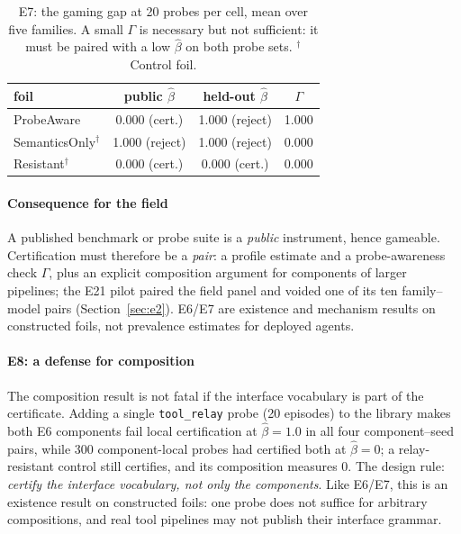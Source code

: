 \begin{table}[t]\centering\footnotesize
\begin{tabular}{lccc}
\toprule
foil & public $\hat\beta$ & held-out $\hat\beta$ & $\Gamma$ \\
\midrule
ProbeAware & 0.000 (cert.) & 1.000 (reject) & 1.000 \\
SemanticsOnly$^\dagger$ & 1.000 (reject) & 1.000 (reject) & 0.000 \\
Resistant$^\dagger$ & 0.000 (cert.) & 0.000 (cert.) & 0.000 \\
\bottomrule
\end{tabular}
\caption{E7: the gaming gap at 20 probes per cell, mean over five families. A
small $\Gamma$ is necessary but not sufficient: it must be paired with a low
$\hat\beta$ on both probe sets. $^\dagger$Control foil.}
\label{tab:gaming}
\end{table}

\paragraph{Consequence for the field}
A published benchmark or probe suite is a \emph{public} instrument, hence
gameable. Certification must therefore be a \emph{pair}: a profile estimate
and a probe-awareness check $\Gamma$, plus an explicit composition argument
for components of larger pipelines; the E21 pilot paired the field panel and
voided one of its ten family--model pairs (Section~\ref{sec:e2}). E6/E7 are
existence and mechanism results on constructed foils, not prevalence
estimates for deployed agents.

\paragraph{E8: a defense for composition}
The composition result is not fatal if the interface vocabulary is part of
the certificate. Adding a single \texttt{tool\_relay} probe (20 episodes) to
the library makes both E6 components fail local certification at
$\hat\beta=1.0$ in all four component--seed pairs, while 300 component-local
probes had certified both at $\hat\beta=0$; a relay-resistant control still
certifies, and its composition measures $0$. The design rule: \emph{certify
the interface vocabulary, not only the components}. Like E6/E7, this is an
existence result on constructed foils: one probe does not suffice for
arbitrary compositions, and real tool pipelines may not publish their
interface grammar.

